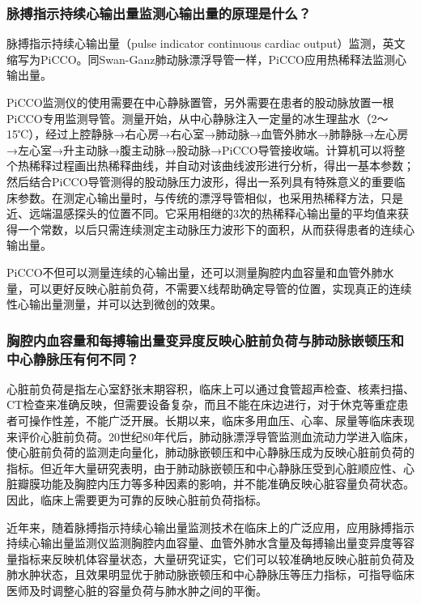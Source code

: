 \subsubsection{脉搏指示持续心输出量监测心输出量的原理是什么？}

脉搏指示持续心输出量（pulse indicator continuous cardiac
output）监测，英文缩写为PiCCO。同Swan-Ganz肺动脉漂浮导管一样，PiCCO应用热稀释法监测心输出量。

PiCCO监测仪的使用需要在中心静脉置管，另外需要在患者的股动脉放置一根PiCCO专用监测导管。测量开始，从中心静脉注入一定量的冰生理盐水（2～15℃），经过上腔静脉→右心房→右心室→肺动脉→血管外肺水→肺静脉→左心房→左心室→升主动脉→腹主动脉→股动脉→PiCCO导管接收端。计算机可以将整个热稀释过程画出热稀释曲线，并自动对该曲线波形进行分析，得出一基本参数；然后结合PiCCO导管测得的股动脉压力波形，得出一系列具有特殊意义的重要临床参数。在测定心输出量时，与传统的漂浮导管相似，也采用热稀释方法，只是近、远端温感探头的位置不同。它采用相继的3次的热稀释心输出量的平均值来获得一个常数，以后只需连续测定主动脉压力波形下的面积，从而获得患者的连续心输出量。

PiCCO不但可以测量连续的心输出量，还可以测量胸腔内血容量和血管外肺水量，可以更好反映心脏前负荷，不需要X线帮助确定导管的位置，实现真正的连续性心输出量测量，并可以达到微创的效果。

\subsubsection{胸腔内血容量和每搏输出量变异度反映心脏前负荷与肺动脉嵌顿压和中心静脉压有何不同？}

心脏前负荷是指左心室舒张末期容积，临床上可以通过食管超声检查、核素扫描、CT检查来准确反映，但需要设备复杂，而且不能在床边进行，对于休克等重症患者可操作性差，不能广泛开展。长期以来，临床多用血压、心率、尿量等临床表现来评价心脏前负荷。20世纪80年代后，肺动脉漂浮导管监测血流动力学进入临床，使心脏前负荷的监测走向量化，肺动脉嵌顿压和中心静脉压成为反映心脏前负荷的指标。但近年大量研究表明，由于肺动脉嵌顿压和中心静脉压受到心脏顺应性、心脏瓣膜功能及胸腔内压力等多种因素的影响，并不能准确反映心脏容量负荷状态。因此，临床上需要更为可靠的反映心脏前负荷指标。

近年来，随着脉搏指示持续心输出量监测技术在临床上的广泛应用，应用脉搏指示持续心输出量监测仪监测胸腔内血容量、血管外肺水含量及每搏输出量变异度等容量指标来反映机体容量状态，大量研究证实，它们可以较准确地反映心脏前负荷及肺水肿状态，且效果明显优于肺动脉嵌顿压和中心静脉压等压力指标，可指导临床医师及时调整心脏的容量负荷与肺水肿之间的平衡。

